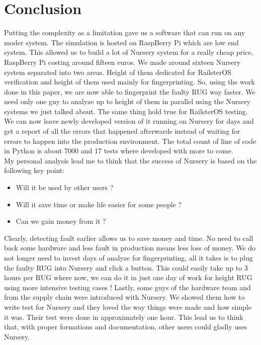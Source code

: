 \documentclass[12pt]{article}
\theoremstyle{definition}
\theoremstyle{definition}
\begin{document}

\clearpage
\part{Conclusion}

Putting the complexity as a limitation gave us a software that can run on any moder system. The simulation is hosted on RaspBerry Pi which are low end system. This allowed us to build a lot of Nursery system for a really cheap price, RaspBerry Pi costing around fifteen euros. We made around sixteen Nursery system separated into two areas. Height of them dedicated for RailsterOS verification and height of them used mainly for fingerprinting. So, using the work done in this paper, we are now able to fingerprint the faulty RUG way faster. We need only one guy to analyze up to height of them in parallel using the Nursery systems we just talked about. The same thing hold true for RailsterOS testing. We can now leave newly developed version of it running on Nursery for days and get a report of all the errors that happened afterwards instead of waiting for errors to happen into the production environment. The total count of line of code in Python is about 7000 and 17 tests where developed with more to come.\\

My personal analysis lead me to think that the success of Nursery is based on the following key point:
\begin{itemize}
\item Will it be used by other users ?
\item Will it save time or make life easier for some people ?
\item Can we gain money from it ?
\end{itemize}

Clearly, detecting fault earlier allows us to save money and time. No need to call back some hardware and less fault in production means less loss of money. We do not longer need to invest days of analyze for fingerprinting, all it takes is to plug the faulty RUG into Nursery and click a button. This could easily take up to 3 hours per RUG where now, we can do it in just one day of work for height RUG using more intensive testing cases ! Lastly, some guys of the hardware team and from the supply chain were introduced with Nursery. We showed them how to write test for Nursery and they loved the way things were made and how simple it was. Their test were done in approximately one hour. This lead us to think that, with proper formations and documentation, other users could gladly uses Nursery.\\
\end{document}
